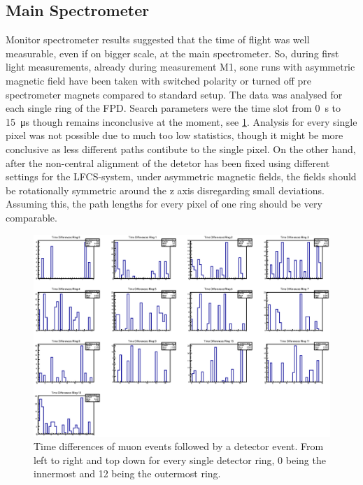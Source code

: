   \subsection{Main Spectrometer}
  \label{ch:Analysis:sec:Monitor Spectrometer Measurements:subsec:Main Spectrometer}
  
  Monitor spectrometer results suggested that the time of flight was well measurable, even if on bigger scale, at the main spectrometer. So, during first light measurements, already during measurement M1, sone runs with asymmetric magnetic field have been taken with switched polarity or turned off pre spectrometer magnets compared to standard setup.
  The data was analysed for each single ring of the FPD. Search parameters were the time slot from \SI{0}{\second} to \SI{15}{\micro\second} though remains inconclusive at the moment, see \ref{fig:mainSpec:allRings}. Analysis for every single pixel was not possible due to much too low statistics, though it might be more conclusive as less different paths contibute to the single pixel. On the other hand, after the non-central alignment of the detetor has been fixed using different settings for the LFCS-system, under asymmetric magnetic fields, the fields should be rotationally symmetric around the z axis disregarding small deviations. Assuming this, the path lengths for every pixel of one ring should be very comparable.
  
  \begin{figure}
  \centering
  	\includegraphics[width = 0.9 \textwidth]{graphics/mainSpec/mainSpecRings.eps}
  	\caption{Time differences of muon events followed by a detector event. From left to right and top down for every single detector ring, 0 being the innermost and 12 being the outermost ring.}
  	\label{fig:mainSpec:allRings}
  \end{figure}

